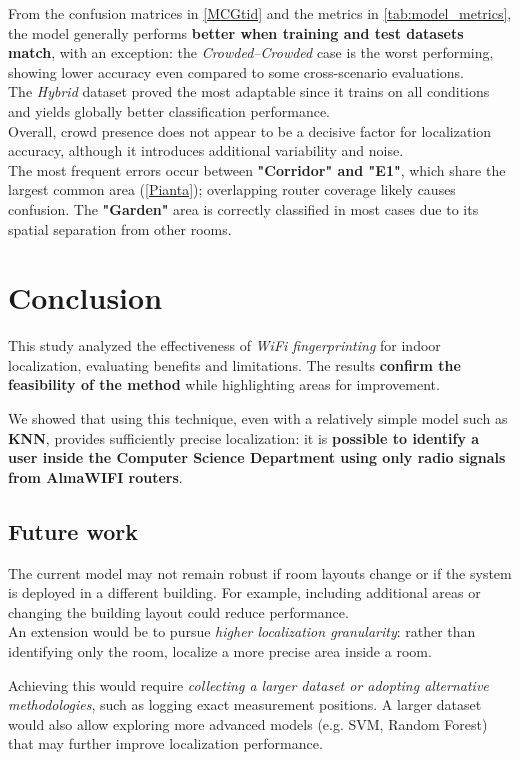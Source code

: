 \documentclass{article}
\begin{document}
From the confusion matrices in \autoref{MCGtid} and the metrics in \autoref{tab:model_metrics}, the model generally performs \textbf{better when training and test datasets match}, with an exception: the \textit{Crowded--Crowded} case is the worst performing, showing lower accuracy even compared to some cross-scenario evaluations.\\
The \textit{Hybrid} dataset proved the most adaptable since it trains on all conditions and yields globally better classification performance.\\

Overall, crowd presence does not appear to be a decisive factor for localization accuracy, although it introduces additional variability and noise.\\
The most frequent errors occur between \textbf{"Corridor" and "E1"}, which share the largest common area (\autoref{Pianta}); overlapping router coverage likely causes confusion. The \textbf{"Garden"} area is correctly classified in most cases due to its spatial separation from other rooms.

\section{Conclusion}
This study analyzed the effectiveness of \textit{WiFi fingerprinting} for indoor localization, evaluating benefits and limitations. The results \textbf{confirm the feasibility of the method} while highlighting areas for improvement.

We showed that using this technique, even with a relatively simple model such as \textbf{KNN}, provides sufficiently precise localization: it is \textbf{possible to identify a user inside the Computer Science Department using only radio signals from AlmaWIFI routers}.

\subsection{Future work}
The current model may not remain robust if room layouts change or if the system is deployed in a different building. For example, including additional areas or changing the building layout could reduce performance.\\
An extension would be to pursue \textit{higher localization granularity}: rather than identifying only the room, localize a more precise area inside a room.

Achieving this would require \textit{collecting a larger dataset or adopting alternative methodologies}, such as logging exact measurement positions. A larger dataset would also allow exploring more advanced models (e.g. SVM, Random Forest) that may further improve localization performance.


\newpage

\end{document}

